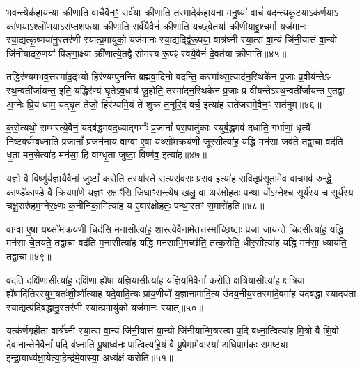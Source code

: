 भव॒न्त्येक॑हायन्या क्रीणाति वा॒चैवैन॒ꣳ॒ सर्व॑या क्रीणाति॒ तस्मा॒देक॑हायना मनु॒ष्या॑ वाचं॑ वद॒न्त्यकू॑ट॒या\-ऽक॑र्ण॒या\-ऽ का॑ण॒या\-ऽश्लो॑ण॒या\-ऽस॑प्तशफया क्रीणाति॒ सर्व॑यै॒वैनं॑ क्रीणाति॒ यच्छ्वे॒तया᳚ क्रीणी॒याद्दु॒श्चर्मा॒ यज॑मानः स्या॒द्यत्कृ॒ष्णया॑नु॒स्तर॑णी स्यात्प्र॒मायु॑को॒ यज॑मानः स्या॒द्यद्द्वि॑रू॒पया॒ वात्र॑घ्नी स्या॒त्स वा॒न्यं जि॑नी॒यात्तं वा॒न्यो जि॑नीयादरु॒णया॑ पिङ्गा॒क्ष्या क्री॑णात्ये॒तद्वै सोम॑स्य रू॒पꣴ स्वयै॒वैनं॑ दे॒वत॑या क्रीणाति॥४५॥

{\anuvakamend[{निष्क्री॑णीष्व॒ दक्षि॑णाभिश्च वदन्ति॒ मन्य॑न्ते गन्ध॒र्वेभ्यो॑ ब॒हुत॑याः पिङ्गा॒क्ष्या दश॑ च॥६॥}]}

तद्धिर॑ण्यमभव॒त्तस्मा॑द॒द्भ्यो हिर॑ण्यम्पुनन्ति ब्रह्मवा॒दिनो॑ वदन्ति॒ कस्मा᳚थ्स॒त्याद॑न॒स्थिके॑न प्र॒जाः प्र॒वीय॑न्ते\-ऽ- स्थ॒न्वती᳚र्जायन्त॒ इति॒ यद्धिर॑ण्यं घृ॒ते॑\-ऽव॒धाय॑ जु॒होति॒ तस्मा॑दन॒स्थिके॑न प्र॒जाः प्र वी॑यन्ते\-ऽस्थ॒न्वती᳚र्जायन्त ए॒तद्वा अ॒ग्नेः प्रि॒यं धाम॒ यद्घृ॒तं तेजो॒ हिर॑ण्यमि॒यं ते॑ शुक्र त॒नूरि॒दं वर्च॒ इत्या॑ह॒ सते॑जसमे॒वैन॒ꣳ॒ सत॑नुम्॥४६॥

क॒रो॒त्यथो॒ सम्भ॑रत्ये॒वैनं॒ यदब॑द्धमवद॒ध्याद्गर्भाः᳚ प्र॒जानां᳚ परा॒पातु॑काः स्युर्ब॒द्धमव॑ दधाति॒ गर्भा॑णां॒ धृत्यै॑ निष्ट॒र्क्य॑म्बध्नाति प्र॒जानां᳚ प्र॒जन॑नाय॒ वाग्वा ए॒षा यथ्सो॑म॒क्रय॑णी॒ जूर॒सीत्या॑ह॒ यद्धि मन॑सा॒ जव॑ते॒ तद्वा॒चा वद॑ति धृ॒ता मन॒सेत्या॑ह॒ मन॑सा॒ हि वाग्धृ॒ता जुष्टा॒ विष्ण॑व॒ इत्या॑ह॥४७॥

य॒ज्ञो वै विष्णु॑र्य॒ज्ञायै॒वैनां॒ जुष्टां᳚ करोति॒ तस्या᳚स्ते स॒त्यस॑वसः प्रस॒व इत्या॑ह सवि॒तृप्र॑सूतामे॒व वाच॒मव॑ रुन्द्धे॒ काण्डे॑काण्डे॒ वै क्रि॒यमा॑णे य॒ज्ञꣳ रक्षाꣳ॑सि जिघाꣳसन्त्ये॒ष खलु॒ वा अर॑क्षोहतः॒ पन्था॒ यो᳚\-ऽग्नेश्च॒ सूर्य॑स्य च॒ सूर्य॑स्य॒ चक्षु॒रारु॑हम॒ग्नेर॒क्ष्णः क॒नीनि॑का॒मित्या॑ह॒ य ए॒वार॑क्षोहतः॒ पन्था॒स्तꣳ स॒मारो॑हति॥४८॥

वाग्वा ए॒षा यथ्सो॑म॒क्रय॑णी॒ चिद॑सि म॒नासीत्या॑ह॒ शास्त्ये॒वैना॑मे॒तत्तस्मा᳚च्छि॒ष्टाः प्र॒जा जा॑यन्ते॒ चिद॒सीत्या॑ह॒ यद्धि मन॑सा चे॒तय॑ते॒ तद्वा॒चा वद॑ति म॒नासीत्या॑ह॒ यद्धि मन॑साभि॒गच्छ॑ति॒ तत्क॒रोति॒ धीर॒सीत्या॑ह॒ यद्धि मन॑सा॒ ध्याय॑ति॒ तद्वा॒चा॥४९॥

वद॑ति॒ दक्षि॑णा॒सीत्या॑ह॒ दक्षि॑णा ह्ये॑षा य॒ज्ञिया॒सीत्या॑ह य॒ज्ञिया॑मे॒वैनां᳚ करोति क्ष॒त्रिया॒सीत्या॑ह क्ष॒त्रिया॒ ह्ये॑षादि॑तिरस्युभ॒यतः॑शी॒र्\mbox{}ष्णीत्या॑ह॒ यदे॒वादि॒त्यः प्रा॑य॒णीयो॑ य॒ज्ञाना॑मादि॒त्य उ॑दय॒नीय॒स्तस्मा॑दे॒वमा॑ह॒ यदब॑द्धा॒ स्यादय॑ता स्या॒द्यत्प॑दिब॒द्धानु॒स्तर॑णी स्यात्प्र॒मायु॑को॒ यज॑मानः स्यात्॥५०॥

यत्क॑र्णगृही॒ता वार्त्र॑घ्नी स्या॒त्स वा॒न्यं जि॑नी॒यात्तं वा॒न्यो जि॑नीयान्मि॒त्रस्त्वा॑ प॒दि ब॑ध्ना॒त्वित्या॑ह मि॒त्रो वै शि॒वो दे॒वाना॒न्तेनै॒वैनां᳚ प॒दि ब॑ध्नाति पू॒षाध्व॑नः पा॒त्वित्या॑हे॒यं वै पू॒षेमामे॒वास्या॑ अधि॒पाम॑कः॒ सम॑ष्ट्या॒ इन्द्रा॒याध्य॑क्षा॒येत्या॒हेन्द्र॑मे॒वास्या॒ अध्य॑क्षं करोति॥५१॥

